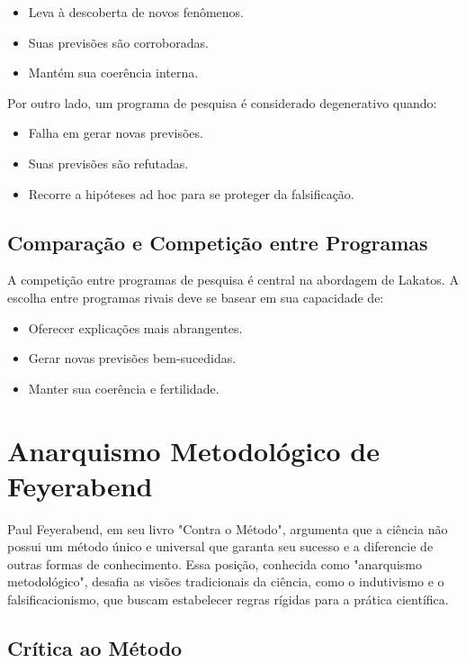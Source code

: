 \documentclass{article} %
\begin{document}
\begin{itemize}
    \item Leva à descoberta de novos fenômenos.
    \item Suas previsões são corroboradas.
    \item Mantém sua coerência interna.
\end{itemize}

Por outro lado, um programa de pesquisa é considerado degenerativo quando:

\begin{itemize}
    \item Falha em gerar novas previsões.
    \item Suas previsões são refutadas.
    \item Recorre a hipóteses ad hoc para se proteger da falsificação.
\end{itemize}

\subsection{Comparação e Competição entre Programas}

A competição entre programas de pesquisa é central na abordagem de Lakatos. A escolha entre programas rivais deve se basear em sua capacidade de:

\begin{itemize}
    \item Oferecer explicações mais abrangentes.
    \item Gerar novas previsões bem-sucedidas.
    \item Manter sua coerência e fertilidade.
\end{itemize}

\section{Anarquismo Metodológico de Feyerabend}

Paul Feyerabend, em seu livro "Contra o Método", argumenta que a ciência não possui um método único e universal que garanta seu sucesso e a diferencie de outras formas de conhecimento. Essa posição, conhecida como "anarquismo metodológico", desafia as visões tradicionais da ciência, como o indutivismo e o falsificacionismo, que buscam estabelecer regras rígidas para a prática científica.

\subsection{Crítica ao Método}
\end{document}
